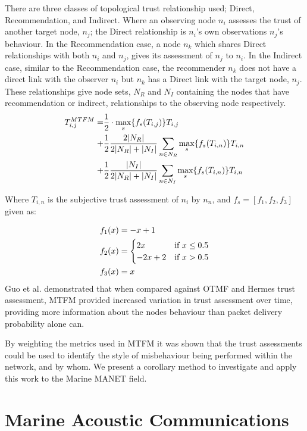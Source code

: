 \documentclass[conference]{IEEEtran}
\begin{document}
There are three classes of topological trust relationship used; Direct, Recommendation, and Indirect.
Where an observing node $n_i$ assesses the trust of another target node, $n_j$; the Direct relationship is $n_i$'s own observations $n_j$'s behaviour.
In the Recommendation case, a node $n_k$ which shares Direct relationships with both $n_i$ and $n_j$, gives its assessment of $n_j$ to $n_i$.
In the Indirect case, similar to the Recommendation case, the recommender $n_k$ does not have a direct link with the observer $n_i$ but $n_k$ has a Direct link with the target node, $n_j$.
These relationships give node sets, $N_R$ and $N_I$ containing the nodes that have recommendation or indirect, relationships to the observing node respectively.
%
\begin{align}
  \label{eq:networkeffects}
  T_{i,j}^{MTFM}=&\frac{1}{2} \cdot \max_s\{f_s(T_{i,j})\} T_{i,j}\\ \notag
  +&\frac{1}{2} \frac{2|N_R| }{2|N_R| + |N_I|}\sum_{n \in N_R} \max_s\{f_s(T_{i,n})\} T_{i,n}\\ \notag
  +&\frac{1}{2} \frac{|N_I| }{2|N_R| + |N_I|}\sum_{n \in N_I} \max_s\{f_s(T_{i,n})\} T_{i,n} 
\end{align}

Where $T_{i,n}$ is the subjective trust assessment of $n_i$ by $n_n$, and $f_s = [ f_1,f_2, f_3]$ given as:

\begin{align}
  \label{eq:whitenization}
  f_1(x)&= -x+1\notag\\
  f_2(x)&= 
  \begin{cases}
    2x & \text{if }x\leq 0.5\\
    -2x+2 & \text{if }x>0.5
  \end{cases}\\
  f_3(x)&= x\notag
\end{align}
%
Guo et al. demonstrated that when compared against OTMF and Hermes trust assessment, MTFM provided increased variation in trust assessment over time, providing more information about the nodes behaviour than packet delivery probability alone can.

By weighting the metrics used in MTFM it was shown that the trust assessments could be used to identify the style of misbehaviour being performed within the network, and by whom.
We present a corollary method to investigate and apply this work to the Marine MANET field.


\section{Marine Acoustic Communications}\label{sec:marineacousticnetworks}
\end{document}
